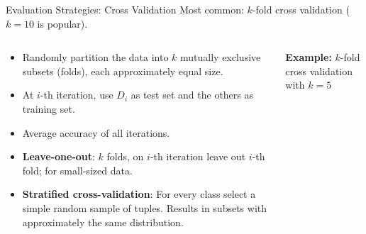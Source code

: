 \begin{frame}{Evaluation Strategies: Cross Validation}
	Most common: $k$-fold cross validation ($k=10$ is popular).

	\begin{columns}[T]
		\begin{column}[T]{0.5\textwidth}
			\begin{itemize}
				\item Randomly partition the data into $k$ mutually exclusive subsets (folds), each approximately equal size.
				\item At $i$-th iteration, use $D_i$ as test set and the others as training set.
				\item Average accuracy of all iterations.
				\item \textbf{Leave-one-out}: $k$ folds, on $i$-th iteration leave out $i$-th fold; for small-sized data.
				\item \textbf{Stratified cross-validation}: For every class select a simple random sample of tuples. Results in subsets with approximately the same distribution.
			\end{itemize}

		\end{column}

		\begin{column}[T]{0.5\textwidth}
			\centering
			\vspace{.3em}
			\textbf{Example:} $k$-fold cross validation with $k=5$\\\medskip


\end{column}
\end{columns}
\end{frame}
